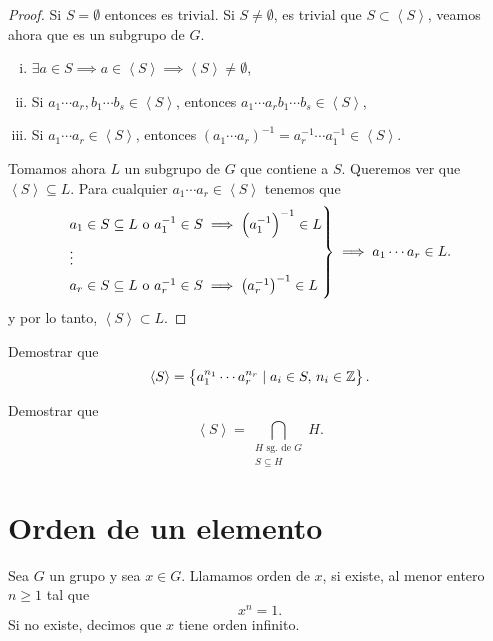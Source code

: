 \begin{proof}
    Si $S = \emptyset$ entonces es trivial.
    Si $S \neq \emptyset$, es trivial que $S \subset \left<S\right>$, veamos ahora que es un subgrupo de $G$.
    \begin{enumerate}[i)]
        \item $\exists a \in S \implies a \in \left<S\right> \implies \left<S\right> \neq \emptyset$,
        \item Si $a_1\cdots a_r, b_1 \cdots b_s \in \left<S\right>$, entonces $a_1 \cdots a_r b_1 \cdots b_s \in \left<S\right>$,
        \item Si $a_1 \cdots a_r \in \left<S\right>$, entonces $\left( a_1 \cdots a_r \right)^{-1} =
            a^{-1}_r \cdots a^{-1}_1 \in \left<S\right>$.
    \end{enumerate}
    Tomamos ahora $L$ un subgrupo de $G$ que contiene a $S$. Queremos ver que $\left<S\right> \subseteq L$.
    Para cualquier $a_1 \cdots a_r \in \left<S\right>$ tenemos que
    \[
        \begin{rcases}
            a_1 \in S \subseteq L \text{ o } a^{-1}_1 \in S \implies \left( a^{-1}_1 \right)^{-1} \in L\\
            \vdots \\
            a_r \in S \subseteq L\text{ o } a^{-1}_r \in S \implies \left( a^{-1}_r \right)^{-1} \in L
        \end{rcases}
        \implies a_1 \cdots a_r \in L.
    \]
    y por lo tanto, $\left<S\right> \subset L$.
\end{proof}

\begin{ej}
    Demostrar que
    \[
        \left<S\right> = \left\{a^{n_1}_1 \cdots a^{n_r}_r \mid a_i \in S, \, n_i \in \mathbb{Z}\right\}.
    \]
\end{ej}

\begin{ej}
    Demostrar que
    \[
        \left<S\right> = \bigcap_{\substack{H \text{ sg. de } G \\ S \subseteq H}} H.
    \]
\end{ej}

\section{Orden de un elemento}

\begin{defi}
    Sea $G$ un grupo y sea $x \in G$. Llamamos orden de $x$, si existe, al menor entero $n \geq 1$ tal que
    \[
        x^n = 1.
    \]
    Si no existe, decimos que $x$ tiene orden infinito.
\end{defi}

